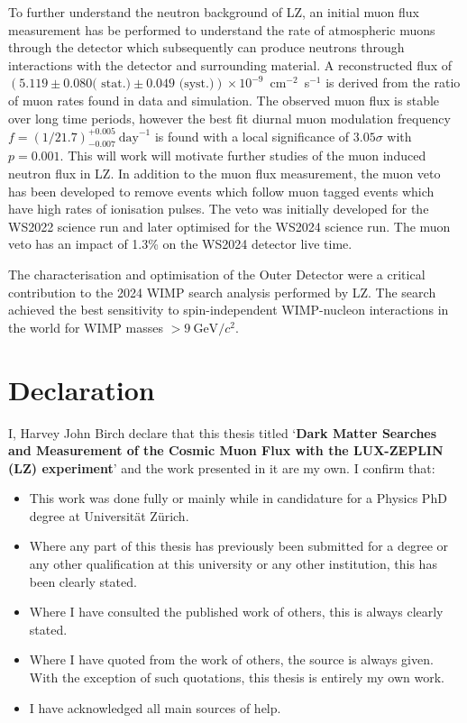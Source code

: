 \documentclass[a4paper,11pt,usegeometry]{scrreprt} %
\begin{document}
To further understand the neutron background of LZ, an initial muon flux measurement has be performed to understand the rate of atmospheric muons through the detector which subsequently can produce neutrons through interactions with the detector and surrounding material. A reconstructed flux of $(5.119 \pm 0.080 \textrm{( stat.)} \pm 0.049 \textrm{ (syst.)})\times10^{-9}$~cm$^{-2}$~s$^{-1}$ is derived from the ratio of muon rates found in data and simulation. The observed muon flux is stable over long time periods, however the best fit diurnal muon modulation frequency $f=(1/21.7)^{+0.005}_{-0.007}~\text{day}^{-1}$ is found with a local significance of $3.05\sigma$ with $p=0.001$. This will work will motivate further studies of the muon induced neutron flux in LZ.
In addition to the muon flux measurement, the muon veto has been developed to remove events which follow muon tagged events which have high rates of ionisation pulses. The veto was initially developed for the WS2022 science run and later optimised for the WS2024 science run. The muon veto has an impact of 1.3\% on the WS2024 detector live time. 

The characterisation and optimisation of the Outer Detector were a critical contribution to the 2024 WIMP search analysis performed by LZ. The search achieved the best sensitivity to spin-independent WIMP-nucleon interactions in the world for WIMP masses $>9~\text{GeV}/c^2$.

\newpage\null\thispagestyle{empty}\newpage

\chapter*{Declaration}
\vskip 1in
I, Harvey John Birch declare that this thesis titled ‘\textbf{Dark Matter Searches and Measurement of the Cosmic Muon Flux with the LUX-ZEPLIN (LZ) experiment}’ and the work presented in it are my own. I confirm that:
\bigbreak

\begin{itemize}
\item This work was done fully or mainly while in candidature for a Physics PhD degree at Universit\"at Z\"urich.
\item Where any part of this thesis has previously been submitted for a degree or any other qualification at this university or any other institution, this has been clearly stated.
\item Where I have consulted the published work of others, this is always clearly stated.
\item Where I have quoted from the work of others, the source is always given. With the exception of such quotations, this thesis is entirely my own work.
\item I have acknowledged all main sources of help.
\end{itemize}
\vskip 2in
\end{document}
